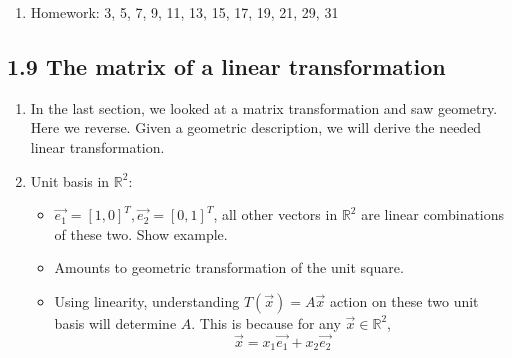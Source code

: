 \documentclass{article}
\begin{document}
\begin{enumerate}
\begin{itemize}
\end{itemize}

\item Homework: 3, 5, 7, 9, 11, 13, 15, 17, 19, 21, 29, 31 	

\end{enumerate}

\subsection{1.9 The matrix of a linear transformation}

\begin{enumerate}

\item In the last section, we looked at a matrix transformation and saw geometry. Here we reverse. Given a geometric description, we will derive the needed linear transformation. 

\item Unit basis in $\mathbb{R}^2$:
\begin{itemize}
\item $\vec{e_1}=[1,0]^T, \vec{e_2}=[0,1]^T$, all other vectors in $\mathbb{R}^2$ are linear combinations of these two. Show example.
\item Amounts to geometric transformation of the unit square.
\item Using linearity, understanding $T(\vec{x})=A\vec{x}$ action on these two unit basis will determine $A$. This is because for any $\vec{x} \in \mathbb{R}^2$,
\[
\vec{x} = x_1 \vec{e_1} + x_2 \vec{e_2}
\]
\end{itemize} 


\end{enumerate}
\end{document}
